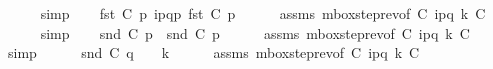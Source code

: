 \begin{isabellebody}
\ \ \ \ \isamarkupfalse%
\ simp\isanewline
\ \ \isamarkupfalse%
\ {\isachardoublequoteopen}fst\ {\isacharparenleft}{\kern0pt}C{}\ p{\isacharparenright}{\kern0pt}\ {\isasymmidarrow}{\isacharbang}{\kern0pt}{\isasymlangle}{\isacharparenleft}{\kern0pt}i\isactrlbsup p{\isasymrightarrow}q\isactrlesup {\isacharparenright}{\kern0pt}{\isasymrangle}{\isasymrightarrow}p\ {\isacharparenleft}{\kern0pt}fst\ {\isacharparenleft}{\kern0pt}C{}\ p{\isacharparenright}{\kern0pt}{\isacharparenright}{\kern0pt}{\isachardoublequoteclose}\isanewline
\ \ \ \ \isamarkupfalse%
\ assms\ mbox{\isacharunderscore}{\kern0pt}step{\isacharunderscore}{\kern0pt}rev{\isacharparenleft}{\kern0pt}{}{\isacharparenright}{\kern0pt}{\isacharbrackleft}{\kern0pt}of\ C{}\ {\isachardoublequoteopen}{\isacharbang}{\kern0pt}{\isasymlangle}{\isacharparenleft}{\kern0pt}i\isactrlbsup p{\isasymrightarrow}q\isactrlesup {\isacharparenright}{\kern0pt}{\isasymrangle}{\isachardoublequoteclose}\ k\ C{}{\isacharbrackright}{\kern0pt}\isanewline
\ \ \ \ \isamarkupfalse%
\ simp\isanewline
\ \ \isamarkupfalse%
\ {\isachardoublequoteopen}snd\ {\isacharparenleft}{\kern0pt}C{}\ p{\isacharparenright}{\kern0pt}\ {\isacharequal}{\kern0pt}\ snd\ {\isacharparenleft}{\kern0pt}C{}\ p{\isacharparenright}{\kern0pt}{\isachardoublequoteclose}\isanewline
\ \ \ \ \isamarkupfalse%
\ assms\ mbox{\isacharunderscore}{\kern0pt}step{\isacharunderscore}{\kern0pt}rev{\isacharparenleft}{\kern0pt}{}{\isacharparenright}{\kern0pt}{\isacharbrackleft}{\kern0pt}of\ C{}\ {\isachardoublequoteopen}{\isacharbang}{\kern0pt}{\isasymlangle}{\isacharparenleft}{\kern0pt}i\isactrlbsup p{\isasymrightarrow}q\isactrlesup {\isacharparenright}{\kern0pt}{\isasymrangle}{\isachardoublequoteclose}\ k\ C{}{\isacharbrackright}{\kern0pt}\isanewline
\ \ \ \ \isamarkupfalse%
\ simp\isanewline
\ \ \isamarkupfalse%
\ {\isachardoublequoteopen}{\isacharparenleft}{\kern0pt}\ {\isacharbar}{\kern0pt}\ {\isacharparenleft}{\kern0pt}snd\ {\isacharparenleft}{\kern0pt}C{}\ q{\isacharparenright}{\kern0pt}{\isacharparenright}{\kern0pt}\ {\isacharbar}{\kern0pt}\ {\isacharparenright}{\kern0pt}\ {\isacharless}{\kern0pt}\isactrlsub {\isasymB}\ k{\isachardoublequoteclose}\isanewline
\ \ \ \ \isamarkupfalse%
\ assms\ mbox{\isacharunderscore}{\kern0pt}step{\isacharunderscore}{\kern0pt}rev{\isacharparenleft}{\kern0pt}{}{\isacharparenright}{\kern0pt}{\isacharbrackleft}{\kern0pt}of\ C{}\ {\isachardoublequoteopen}{\isacharbang}{\kern0pt}{\isasymlangle}{\isacharparenleft}{\kern0pt}i\isactrlbsup p{\isasymrightarrow}q\isactrlesup {\isacharparenright}{\kern0pt}{\isasymrangle}{\isachardoublequoteclose}\ k\ C{}{\isacharbrackright}{\kern0pt}\isanewline

\end{isabellebody}
